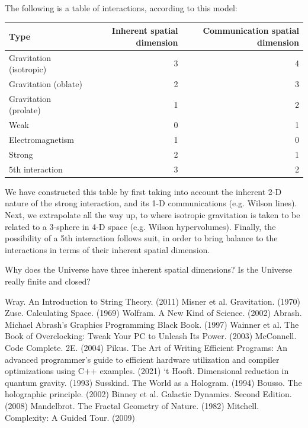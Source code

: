 \documentclass[12pt]{article}
\begin{document}
{The following is a table of interactions, according to this model:
\begin{center}
\begin{tabular}{| l | r | r |}
  \hline
  Type & Inherent spatial dimension & Communication spatial dimension \\
\hline
\hline
Gravitation (isotropic) & 3  & 4\\
Gravitation (oblate) & 2 & 3\\
Gravitation (prolate) & 1 & 2\\
Weak & 0 & 1\\
Electromagnetism & 1 & 0 \\
Strong & 2 & 1\\
$5$th interaction & 3 & 2 \\
  \hline  
\end{tabular}
\end{center}
We have constructed this table by first taking into account the inherent 2-D nature of the strong interaction, and its 1-D communications (e.g. Wilson lines).
Next, we extrapolate all the way up, to where isotropic gravitation is taken to be related to a 3-sphere in 4-D space (e.g. Wilson hypervolumes). 
Finally, the possibility of a 5th interaction follows suit, in order to bring balance to the interactions in terms of their inherent spatial dimension.

Why does the Universe have three inherent spatial dimensions?
Is the Universe really finite and closed?




\pagebreak




\begin{thebibliography}{9}

 Wray. An Introduction to String Theory. (2011)
 Misner et al. Gravitation. (1970)
 Zuse. Calculating Space. (1969)
 Wolfram. A New Kind of Science. (2002)
 Abrash. Michael Abrash's Graphics Programming Black Book. (1997)
 Wainner et al. The Book of Overclocking: Tweak Your PC to Unleash Its Power. (2003)
 McConnell. Code Complete. 2E. (2004)
 Pikus. The Art of Writing Efficient Programs: An advanced programmer's guide to efficient hardware utilization and compiler optimizations using C++ examples. (2021)
 `t Hooft. Dimensional reduction in quantum gravity. (1993)
 Susskind. The World as a Hologram. (1994)
 Bousso. The holographic principle. (2002)
 Binney et al. Galactic Dynamics. Second Edition. (2008)
 Mandelbrot. The Fractal Geometry of Nature. (1982)
 Mitchell. Complexity: A Guided Tour. (2009)






\end{thebibliography}}
\end{document}
